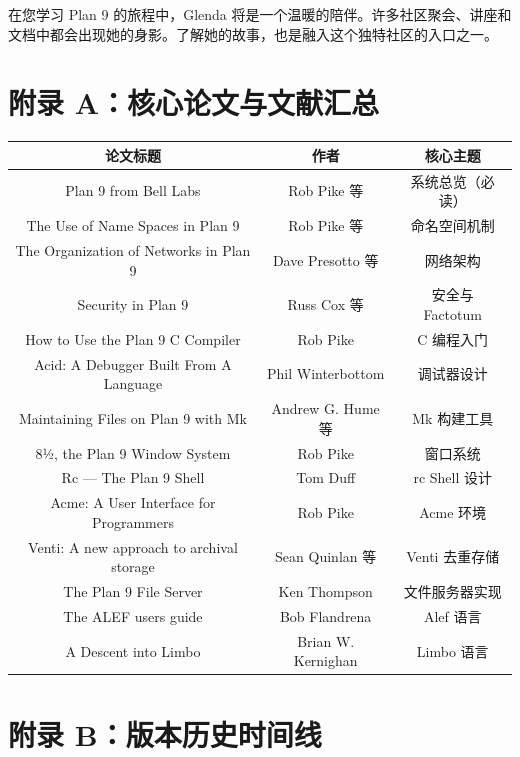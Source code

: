 \documentclass[12pt,UTF8]{ctexbook}
\begin{document}
在您学习 Plan 9 的旅程中，Glenda 将是一个温暖的陪伴。许多社区聚会、讲座和文档中都会出现她的身影。了解她的故事，也是融入这个独特社区的入口之一。

\backmatter

\chapter*{附录 A：核心论文与文献汇总}

\begin{center}
	\begin{tabular}{|c|c|c|}
		\hline
		\textbf{论文标题} & \textbf{作者} & \textbf{核心主题} \\
		\hline
		Plan 9 from Bell Labs & Rob Pike 等 & 系统总览（必读） \\
		The Use of Name Spaces in Plan 9 & Rob Pike 等 & 命名空间机制 \\
		The Organization of Networks in Plan 9 & Dave Presotto 等 & 网络架构 \\
		Security in Plan 9 & Russ Cox 等 & 安全与 Factotum \\
		How to Use the Plan 9 C Compiler & Rob Pike & C 编程入门 \\
		Acid: A Debugger Built From A Language & Phil Winterbottom & 调试器设计 \\
		Maintaining Files on Plan 9 with Mk & Andrew G. Hume 等 & Mk 构建工具 \\
		8½, the Plan 9 Window System & Rob Pike & 窗口系统 \\
		Rc — The Plan 9 Shell & Tom Duff & rc Shell 设计 \\
		Acme: A User Interface for Programmers & Rob Pike & Acme 环境 \\
		Venti: A new approach to archival storage & Sean Quinlan 等 & Venti 去重存储 \\
		The Plan 9 File Server & Ken Thompson & 文件服务器实现 \\
		The ALEF users guide & Bob Flandrena & Alef 语言 \\
		A Descent into Limbo & Brian W. Kernighan & Limbo 语言 \\
		\hline
	\end{tabular}
\end{center}

\chapter*{附录 B：版本历史时间线}
\end{document}
